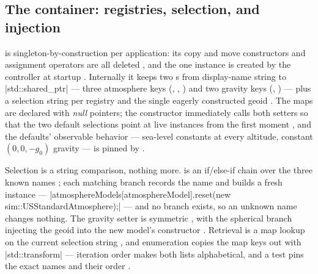 \subsection{The container: registries, selection, and injection}\label{sec:environment-container}

 is singleton-by-construction per application: its copy and move
constructors and assignment operators are all deleted , and the
one instance is created by the  controller at startup
. Internally it keeps two s from display-name string to
\cppinline|std::shared_ptr| --- three atmosphere keys (,
, )  and two gravity
keys (, ) 
--- plus a selection string per registry  and the single eagerly
constructed geoid . The maps are declared with \emph{null}
pointers; the constructor immediately calls both setters so that the two default selections
point at live instances from the first moment , and the defaults'
observable behavior --- sea-level constants at every altitude, constant $(0, 0, -g_0)$
gravity --- is pinned by 
.

Selection is a string comparison, nothing more.  is an
if/else-if chain over the three known names ; each matching
branch records the name and builds a fresh instance ---
\cppinline|atmosphereModels[atmosphereModel].reset(new sim::USStandardAtmosphere);|
 --- and no  branch exists, so an unknown name changes
nothing. The gravity setter is symmetric , with the spherical
branch injecting the geoid into the new model's constructor .
Retrieval is a map lookup on the current selection string , and
enumeration copies the map keys out with \cppinline|std::transform|
 ---  iteration order makes both lists
alphabetical, and a test pins the exact names and their order
.

